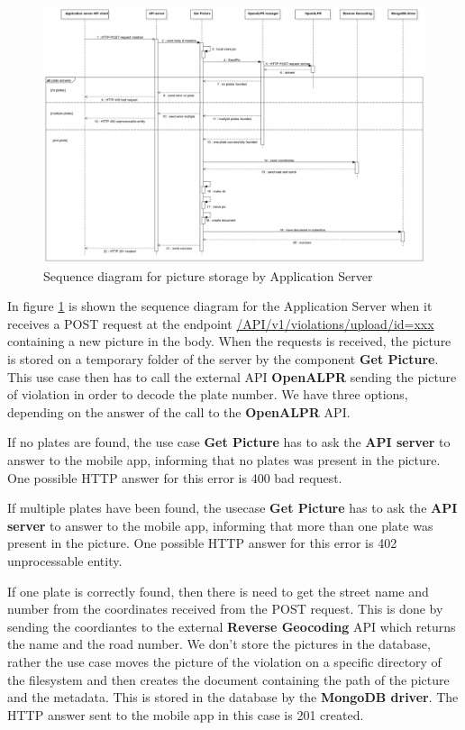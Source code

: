 \begin{figure}[H]
\centering
\includegraphics[width=\textwidth]{Images/DDSeqSeverPic.png}
\caption{\label{fig:DDSeqSeverPic} Sequence diagram for picture storage by Application Server}
\end{figure}
In figure \ref{fig:DDSeqSeverPic} is shown the sequence diagram for the Application Server when it receives a POST request at the endpoint \url{/API/v1/violations/upload/id=xxx} containing a new picture in the body. When the requests is received, the picture is stored on a temporary folder of the server by the component \textbf{Get Picture}. This use case then has to call the external API \textbf{OpenALPR} sending the picture of violation in order to decode the plate number. We have three options, depending on the answer of the call to the \textbf{OpenALPR} API.

If no plates are found, the use case \textbf{Get Picture} has to ask the \textbf{API server} to answer to the mobile app, informing that no plates was present in the picture. One possible HTTP answer for this error is \textcolor{poliblue}{400 bad request}.

If multiple plates have been found, the usecase \textbf{Get Picture} has to ask the \textbf{API server} to answer to the mobile app, informing that more than one plate was present in the picture. One possible HTTP answer for this error is \textcolor{poliblue}{402 unprocessable entity}.

If one plate is correctly found, then there is need to get the street name and number from the coordinates received from the POST request. This is done by sending the coordiantes to the external \textbf{Reverse Geocoding} API which returns the name and the road number.
We don't store the pictures in the database, rather the use case moves the picture of the violation on a specific directory of the filesystem and then creates the document containing the path of the picture and the metadata. This is stored in the database by the \textbf{MongoDB driver}. The HTTP answer sent to the mobile app in this case is \textcolor{poliblue}{201 created}.

